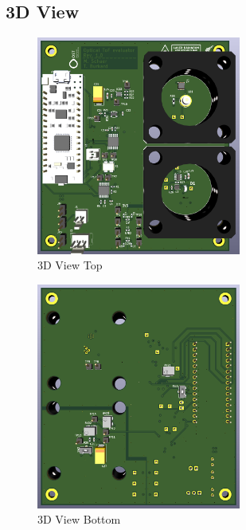 \pagebreak

\subsection{3D View}

\begin{figure}[H]
    \centering
    \includegraphics[width=0.6\textwidth]{graphics/3d_top.png}
    \caption{3D View Top}\label{fig:3d_top}
\end{figure}

\begin{figure}[H]
    \centering
    \includegraphics[width=0.6\textwidth]{graphics/3d_bottom.png}
    \caption{3D View Bottom}\label{fig:3d_bottom}
\end{figure}
